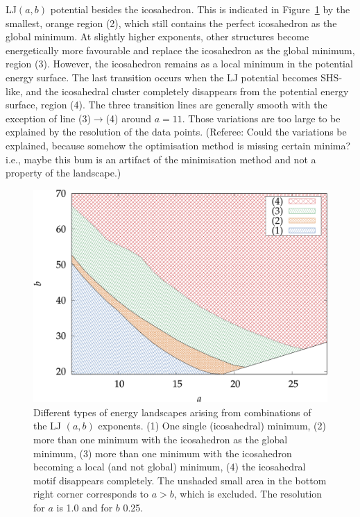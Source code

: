 LJ$(a,b)$ potential besides the icosahedron. This is indicated in
Figure~\ref{fig:no-ico} by the smallest, orange region (2), which still
contains the perfect icosahedron as the global minimum. At slightly higher
exponents, other structures become energetically more favourable and replace
the icosahedron as the global minimum, region (3). However, the icosahedron
remains as a local minimum in the potential energy surface. The last transition
occurs when the LJ potential becomes SHS-like, and the icosahedral cluster
completely disappears from the potential energy surface, region (4). The three
transition lines are generally smooth with the exception of line
(3)$\rightarrow$(4) around $a=11$. Those variations are too large to be
explained by the resolution of the data points. {\color{red} (Referee: Could the variations be explained, because somehow the optimisation method is missing certain minima? i.e., maybe this bum is an artifact of the minimisation method and not a property of the landscape.)}

\begin{figure}[htb]\centering
    \includegraphics[width=.8\columnwidth]{gregory-newton/no-ico.pdf}
    \caption{Different types of energy landscapes arising from combinations of
    the LJ $(a,b)$ exponents. (1) One single (icosahedral) minimum, (2) more
    than one minimum with the icosahedron as the global minimum, (3) more than
    one minimum with the icosahedron becoming a local (and not global) minimum,
    (4) the icosahedral motif disappears completely. The unshaded small area
    in the bottom right corner corresponds to $a>b$, which is excluded. The
    resolution for $a$ is 1.0 and for $b$ 0.25.}
    \label{fig:no-ico}
\end{figure}

